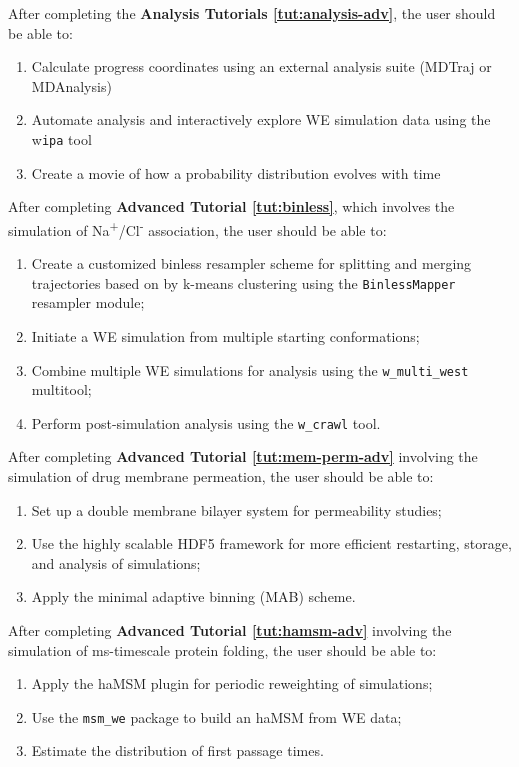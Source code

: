 After completing the \textbf{Analysis Tutorials \ref{tut:analysis-adv}}, the user should be able to:
\begin{enumerate}
\item Calculate progress coordinates using an external analysis suite (MDTraj or MDAnalysis)
\item Automate analysis and interactively explore WE simulation data using the w\textunderscore \verb|ipa| tool
\item Create a movie of how a probability distribution evolves with time
\end{enumerate}

After completing \textbf{Advanced Tutorial \ref{tut:binless}}, which involves the simulation of Na\textsuperscript{+}/Cl\textsuperscript{-} association, the user should be able to:
\begin{enumerate}
  \item Create a customized binless resampler scheme for splitting and merging trajectories based on by k-means clustering using the \verb|BinlessMapper| resampler module;
  \item Initiate a WE simulation from multiple starting conformations;
  \item Combine multiple WE simulations for analysis using the \verb|w_multi_west| multitool;
  \item Perform post-simulation analysis using the \verb|w_crawl| tool.
\end{enumerate}

After completing \textbf{Advanced Tutorial \ref{tut:mem-perm-adv}} involving the simulation of drug membrane permeation, the user should be able to:
\begin{enumerate}
  \item Set up a double membrane bilayer system for permeability studies; 
  \item Use the highly scalable HDF5 framework for more efficient restarting, storage, and analysis of simulations;
  \item Apply the minimal adaptive binning (MAB) scheme.
\end{enumerate}

After completing \textbf{Advanced Tutorial \ref{tut:hamsm-adv}} involving the simulation of ms-timescale protein folding, the user should be able to:
\begin{enumerate}
  \item Apply the haMSM plugin for periodic reweighting of simulations;
  \item Use the \verb|msm_we| package to build an haMSM from WE data;
  \item Estimate the distribution of first passage times.
\end{enumerate}

